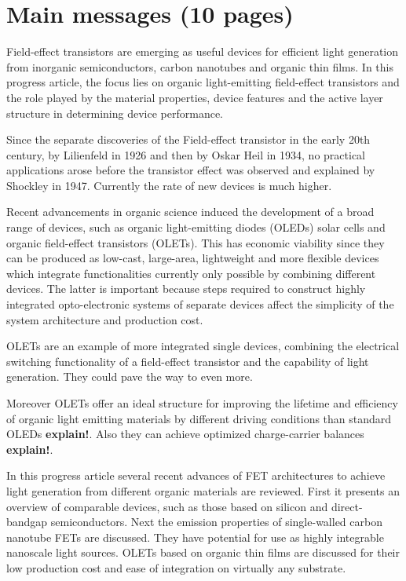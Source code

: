 \section{Main messages (10 pages)}

Field-effect transistors are emerging as useful devices for efficient light generation from inorganic semiconductors, carbon nanotubes and organic thin films. In this progress article, the focus lies on organic light-emitting field-effect transistors and the role played by the material properties, device features and the active layer structure in determining device performance.

Since the separate discoveries of the Field-effect transistor in the early 20th century, by Lilienfeld in 1926 and then by Oskar Heil in 1934, no practical applications arose before the transistor effect was observed and explained by Shockley in 1947. Currently the rate of new devices is much higher.

Recent advancements in organic science induced the development of a broad range of devices, such as organic light-emitting diodes (OLEDs) solar cells and organic field-effect transistors (OLETs). This has economic viability since they can be produced as low-cast, large-area, lightweight and more flexible devices which integrate functionalities currently only possible by combining different devices. The latter is important because steps required to construct highly integrated opto-electronic systems of separate devices affect the simplicity of the system architecture and production cost.

OLETs are an example of more integrated single devices, combining the electrical switching functionality of a field-effect transistor and the capability of light generation. They could pave the way to even more. 

Moreover OLETs offer an ideal structure for improving the lifetime and efficiency of organic light emitting materials by different driving conditions than standard OLEDs \textbf{explain!}. Also they can achieve optimized charge-carrier balances \textbf{explain!}.

In this progress article several recent advances of FET architectures to achieve light generation from different organic materials are reviewed. First it presents an overview of comparable devices, such as those based on silicon and direct-bandgap semiconductors. Next the emission properties of single-walled carbon nanotube FETs are discussed. They have potential for use as highly integrable nanoscale light sources. OLETs based on organic thin films are discussed for their low production cost and ease of integration on virtually any substrate. 
